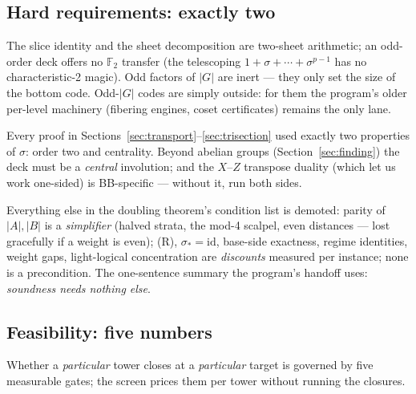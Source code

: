 \documentclass[11pt]{article}
\theoremstyle{plain}
\theoremstyle{definition}
\theoremstyle{remark}
\newcommand{\F}{\mathbb{F}}
\newcommand{\Z}{\mathbb{Z}}
\newcommand{\wt}[1]{\lvert #1\rvert}
\begin{document}
\subsection{Hard requirements: exactly two}

\begin{description}[leftmargin=2em,style=nextline]
\item[C1: a free $\Z_2$ deck --- that is, $2 \mid \lvert G \rvert$.]
  The slice identity and the sheet decomposition are two-sheet
  arithmetic; an odd-order deck offers no $\F_2$ transfer (the
  telescoping $1 + \sigma + \cdots + \sigma^{p-1}$ has no
  characteristic-2 magic). Odd factors of $\lvert G\rvert$ are inert ---
  they only set the size of the bottom code. Odd-$\lvert G \rvert$ codes
  are simply outside: for them the program's older per-level machinery
  (fibering engines, coset certificates) remains the only lane.
\item[C2: the two-block group-algebra CSS shape, with a central deck.]
  Every proof in Sections~\ref{sec:transport}--\ref{sec:trisection} used
  exactly two properties of $\sigma$: order two and centrality. Beyond
  abelian groups (Section~\ref{sec:finding}) the deck must be a
  \emph{central} involution; and the $X$--$Z$ transpose duality (which
  let us work one-sided) is BB-specific --- without it, run both sides.
\end{description}

Everything else in the doubling theorem's condition list is demoted:
parity of $\wt A, \wt B$ is a \emph{simplifier} (halved strata, the
mod-4 scalpel, even distances --- lost gracefully if a weight is even);
(R), $\sigma_* = \mathrm{id}$, base-side exactness, regime identities,
weight gaps, light-logical concentration are \emph{discounts} measured
per instance; none is a precondition. The one-sentence summary the
program's handoff uses: \emph{soundness needs nothing else}.

\subsection{Feasibility: five numbers}

Whether a \emph{particular} tower closes at a \emph{particular} target is
governed by five measurable gates; the screen prices them per tower
without running the closures.
\end{document}
